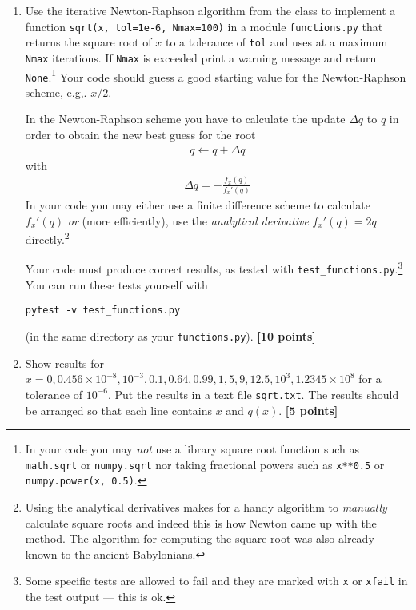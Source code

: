 \documentclass[letterpaper]{scrartcl}
\newcounter{TotalPoints}
\newcounter{TotalBonus}
\newcommand{\BONUS}{\textsc{Bonus: }}
\newcommand{\bonus}[1]{\textbf{[bonus +#1*]}\stepcounter{TotalBonus}}
\newcommand{\points}[1]{\textbf{[#1 points]}\stepcounter{TotalPoints}}
\newenvironment{enuma}{\begin{enumerate}[label=(\alph*)]}{\end{enumerate}}
\begin{document}
\begin{enuma}
\item \label{li:NR} Use the iterative Newton-Raphson algorithm from the class to
  implement a function \texttt{sqrt(x, tol=1e-6, Nmax=100)} in a
  module \texttt{functions.py} that returns the square root of $x$ to
  a tolerance of \texttt{tol} and uses at a maximum \texttt{Nmax}
  iterations. If \texttt{Nmax} is exceeded print a warning message and
  return \texttt{None}.\footnote{In your code you may \emph{not} use a
    library square root function such as \texttt{math.sqrt} or
    \texttt{numpy.sqrt} nor taking fractional powers such as
    \texttt{x**0.5} or \texttt{numpy.power(x, 0.5)}.} Your code should
  guess a good starting value for the Newton-Raphson scheme,
  e.g,. $x/2$. 

  In the Newton-Raphson scheme you have to calculate the update
  $\Delta q$ to $q$ in order to obtain the new best guess for the root
  \begin{gather}
    \label{eq:update}
    q \leftarrow q + \Delta q
  \end{gather}
  with
  \begin{gather}
    \label{eq:NR}
    \Delta q = -\frac{f_{x}(q)}{f_{x}'(q)}
  \end{gather}
  In your code you may either use a finite difference scheme to
  calculate $f_{x}'(q)$ \emph{or} (more efficiently), use the
  \emph{analytical derivative} $f_{x}'(q) = 2q$
  directly.\footnote{Using the analytical derivatives makes for a
    handy algorithm to \emph{manually} calculate square roots and
    indeed this is how Newton came up with the method. The algorithm
    for computing the square root was also already known to the
    ancient Babylonians.}

  Your code must produce correct results, as tested with
  \texttt{test\_functions.py}.\footnote{Some specific tests are
    allowed to fail and they are marked with \texttt{x} or
    \texttt{xfail} in the test output --- this is ok.} You can run
  these tests yourself with
\begin{verbatim}
pytest -v test_functions.py
\end{verbatim}
  (in the same directory as your \texttt{functions.py}). \points{10}
\item \label{li:results} Show results for
  $x = 0, 0.456\times 10^{-8}, 10^{-3}, 0.1, 0.64, 0.99, 1, 5, 9, 12.5,
  10^{3}, 1.2345 \times 10^{8}$
  for a tolerance of $10^{-6}$. Put the results in a text file
  \texttt{sqrt.txt}. The results should be arranged so that each line
  contains $x$ and $q(x)$. \points{5}
\end{enuma}
\end{document}
